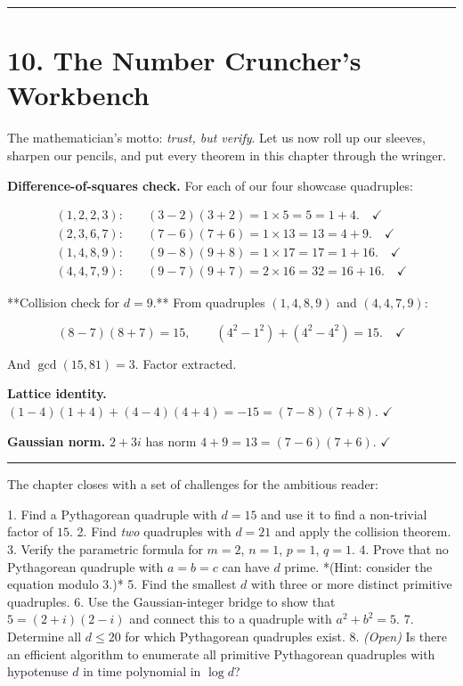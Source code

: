 \documentclass[12pt, letterpaper, openany]{book}
\theoremstyle{definition}
\theoremstyle{remark}
\begin{document}
\bigskip\noindent\rule{\textwidth}{0.4pt}\bigskip



\section*{10. The Number Cruncher's Workbench}


The mathematician's motto: \textit{trust, but verify}. Let us now roll up our sleeves, sharpen our pencils, and put every theorem in this chapter through the wringer.

\textbf{Difference-of-squares check.} For each of our four showcase quadruples:

\[
\begin{aligned}
(1,2,2,3): &\quad (3-2)(3+2) = 1 \times 5 = 5 = 1 + 4. \quad \checkmark \\
(2,3,6,7): &\quad (7-6)(7+6) = 1 \times 13 = 13 = 4 + 9. \quad \checkmark \\
(1,4,8,9): &\quad (9-8)(9+8) = 1 \times 17 = 17 = 1 + 16. \quad \checkmark \\
(4,4,7,9): &\quad (9-7)(9+7) = 2 \times 16 = 32 = 16 + 16. \quad \checkmark
\end{aligned}
\]

**Collision check for $d = 9$.** From quadruples $(1,4,8,9)$ and $(4,4,7,9)$:

\[
(8-7)(8+7) = 15, \qquad (4^2 - 1^2) + (4^2 - 4^2) = 15. \quad \checkmark
\]

And $\gcd(15, 81) = 3$. Factor extracted.

\textbf{Lattice identity.} $(1-4)(1+4) + (4-4)(4+4) = -15 = (7-8)(7+8)$. $\checkmark$

\textbf{Gaussian norm.} $2 + 3i$ has norm $4 + 9 = 13 = (7-6)(7+6)$. $\checkmark$


\bigskip\noindent\rule{\textwidth}{0.4pt}\bigskip


The chapter closes with a set of challenges for the ambitious reader:

1. Find a Pythagorean quadruple with $d = 15$ and use it to find a non-trivial factor of $15$.
2. Find \textit{two} quadruples with $d = 21$ and apply the collision theorem.
3. Verify the parametric formula for $m = 2$, $n = 1$, $p = 1$, $q = 1$.
4. Prove that no Pythagorean quadruple with $a = b = c$ can have $d$ prime. *(Hint: consider the equation modulo $3$.)*
5. Find the smallest $d$ with three or more distinct primitive quadruples.
6. Use the Gaussian-integer bridge to show that $5 = (2 + i)(2 - i)$ and connect this to a quadruple with $a^2 + b^2 = 5$.
7. Determine all $d \le 20$ for which Pythagorean quadruples exist.
8. \textit{(Open)} Is there an efficient algorithm to enumerate all primitive Pythagorean quadruples with hypotenuse $d$ in time polynomial in $\log d$?
\end{document}
